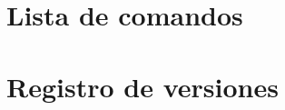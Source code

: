 \documentclass[a4paper,
	11pt,
	parskip=full,
	bibliography=totoc,
	twoside
	]{scrartcl}
\let\oldsection\section
\def\section{\cleardoubleoddpage\oldsection}
\renewcommand{\sectionmark}[1]{\markright{\thesection.\ #1}}
\begin{document}
\cleardoubleoddpage
	\renewcommand{\sectionmark}[1]{}
\begin{thebibliography}{9}
	\raggedright
	
\end{thebibliography}
\markright{\appendixname}

\cleardoubleoddpage
\appendix
{}

\section{Lista de comandos}
\label{app:command_list}
	

\section{Registro de versiones}
\label{app:changelog}
\singlespacing
	\begin{multicols}{2}
		
	\end{multicols}
\end{document}
